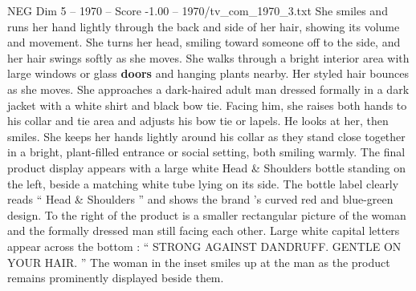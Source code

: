 \begin{textsample}{NEG Dim 5 – 1970 – Score -1.00 – 1970/tv\_com\_1970\_3.txt}
She smiles and runs her hand lightly through the back and side of her hair, showing its volume and movement.
She turns her head, smiling toward someone off to the side, and her hair swings softly as she moves.
She walks through a bright interior area with large windows or glass \textbf{doors} and hanging plants nearby.
Her styled hair bounces as she moves.
She approaches a dark-haired adult man dressed formally in a dark jacket with a white shirt and black bow tie.
Facing him, she raises both hands to his collar and tie area and adjusts his bow tie or lapels.
He looks at her, then smiles.
She keeps her hands lightly around his collar as they stand close together in a bright, plant-filled entrance or social setting, both smiling warmly.
The final product display appears with a large white Head \& Shoulders bottle standing on the left, beside a matching white tube lying on its side.
The bottle label clearly reads “ Head \& Shoulders ” and shows the brand ’s curved red and blue-green design.
To the right of the product is a smaller rectangular picture of the woman and the formally dressed man still facing each other.
Large white capital letters appear across the bottom : “ STRONG AGAINST DANDRUFF.
GENTLE ON YOUR HAIR. ” The woman in the inset smiles up at the man as the product remains prominently displayed beside them.

\end{textsample}
